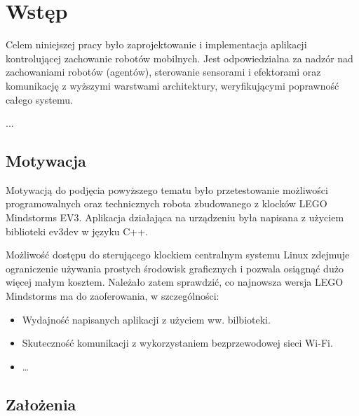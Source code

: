 \chapter{Wstęp}

Celem niniejszej pracy było zaprojektowanie i implementacja aplikacji kontrolującej zachowanie robotów mobilnych. Jest odpowiedzialna za nadzór nad zachowaniami robotów (agentów), sterowanie sensorami i efektorami oraz komunikację z wyższymi warstwami architektury, weryfikującymi poprawność całego systemu.

...


\section{Motywacja}

Motywacją do podjęcia powyższego tematu było przetestowanie możliwości programowalnych oraz technicznych robota zbudowanego z klocków LEGO Mindstorms EV3. Aplikacja działająca na urządzeniu była napisana z użyciem biblioteki ev3dev \cite{ev3dev} w języku C++.

Możliwość dostępu do sterującego klockiem centralnym systemu Linux zdejmuje ograniczenie używania prostych środowisk graficznych i pozwala osiągnąć dużo więcej małym kosztem. Należało zatem sprawdzić, co najnowsza wersja LEGO Mindstorms ma do zaoferowania, w szczególności:
\begin{itemize}
    \item Wydajność napisanych aplikacji z użyciem ww. bilbioteki.
    \item Skuteczność komunikacji z wykorzystaniem bezprzewodowej sieci Wi-Fi.
    \item \dots
\end{itemize}

\section{Założenia}

